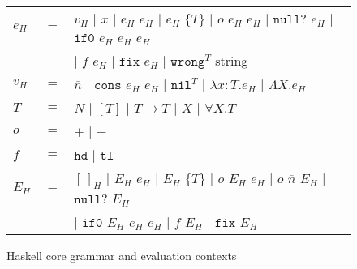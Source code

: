 \begin{figure}[p]
\centering
\begin{tabular}{lcl}
\vspace{5pt}

$e_{H}$ & $=$ & $v_{H}$ $\vert$ $x$ $\vert$ $e_{H}$ $e_{H}$ $\vert$ $e_{H}$ $\lbrace T\rbrace$ $\vert$ $o$ $e_{H}$ $e_{H}$ $\vert$ $\mathtt{null?}$ $e_{H}$ $\vert$ $\mathtt{if0}$ $e_{H}$ $e_{H}$ $e_{H}$ \\

\vspace{5pt}

&& $\vert$ $f$ $e_{H}$ $\vert$ $\mathtt{fix}$ $e_{H}$ $\vert$ $\mathtt{wrong}^{T}$ string \\

\vspace{5pt}

$v_{H}$ & $=$ & $\overline{n}$ $\vert$ $\mathtt{cons}$ $e_{H}$ $e_{H}$ $\vert$ $\mathtt{nil}^{T}$ $\vert$ $\lambda x:T.e_{H}$ $\vert$ $\Lambda X.e_{H}$ \\

\vspace{5pt}

$T$ & $=$ & $N$ $\vert$ $[T]$ $\vert$ $T\rightarrow T$ $\vert$ $X$ $\vert$ $\forall X.T$ \\

\vspace{5pt}

$o$ & $=$ & $+$ $\vert$ $-$ \\

\vspace{5pt}

$f$ & $=$ & $\mathtt{hd}$ $\vert$ $\mathtt{tl}$ \\

\vspace{5pt}

$E_{H}$ & $=$ & $[\,]_{H}$ $\vert$ $E_{H}$ $e_{H}$ $\vert$ $E_{H}$ $\lbrace T\rbrace$ $\vert$ $o$ $E_{H}$ $e_{H}$ $\vert$ $o$ $\overline{n}$ $E_{H}$ $\vert$ $\mathtt{null?}$ $E_{H}$ \\

\vspace{5pt}

&& $\vert$ $\mathtt{if0}$ $E_{H}$ $e_{H}$ $e_{H}$ $\vert$ $f$ $E_{H}$ $\vert$ $\mathtt{fix}$ $E_{H}$
\end{tabular}
\caption{Haskell core grammar and evaluation contexts}
\label{chg}
\end{figure}